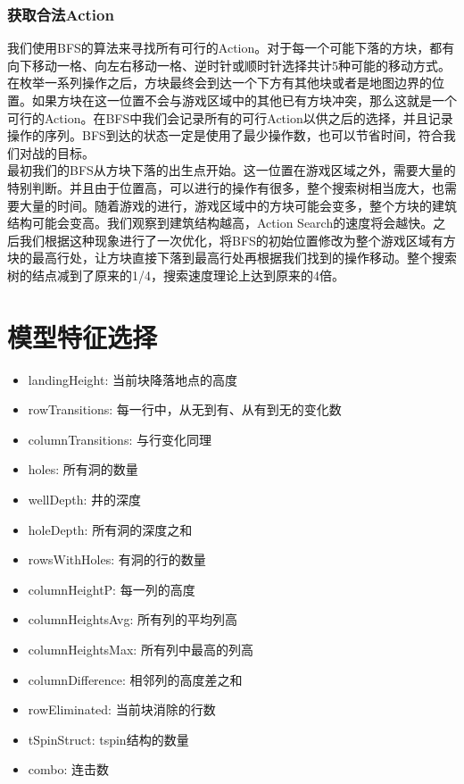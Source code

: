 \documentclass[10pt,UTF8]{article}
\begin{document}
\begin{multicols}{2}
\subsubsection{获取合法Action}

我们使用BFS的算法来寻找所有可行的Action。对于每一个可能下落的方块，都有向下移动一格、向左右移动一格、逆时针或顺时针选择共计5种可能的移动方式。在枚举一系列操作之后，方块最终会到达一个下方有其他块或者是地图边界的位置。如果方块在这一位置不会与游戏区域中的其他已有方块冲突，那么这就是一个可行的Action。在BFS中我们会记录所有的可行Action以供之后的选择，并且记录操作的序列。BFS到达的状态一定是使用了最少操作数，也可以节省时间，符合我们对战的目标。\\

最初我们的BFS从方块下落的出生点开始。这一位置在游戏区域之外，需要大量的特别判断。并且由于位置高，可以进行的操作有很多，整个搜索树相当庞大，也需要大量的时间。随着游戏的进行，游戏区域中的方块可能会变多，整个方块的建筑结构可能会变高。我们观察到建筑结构越高，Action Search的速度将会越快。之后我们根据这种现象进行了一次优化，将BFS的初始位置修改为整个游戏区域有方块的最高行处，让方块直接下落到最高行处再根据我们找到的操作移动。整个搜索树的结点减到了原来的1/4，搜索速度理论上达到原来的4倍。

\section{模型特征选择}

\begin{itemize}
    \itemsep-5pt
    \item landingHeight: 当前块降落地点的高度
    \item rowTransitions: 每一行中，从无到有、从有到无的变化数
    \item columnTransitions: 与行变化同理
    \item holes: 所有洞的数量
    \item wellDepth: 井的深度
    \item holeDepth: 所有洞的深度之和
    \item rowsWithHoles: 有洞的行的数量
    \item columnHeightP: 每一列的高度
    \item columnHeightsAvg: 所有列的平均列高
    \item columnHeightsMax: 所有列中最高的列高
    \item columnDifference: 相邻列的高度差之和
    \item rowEliminated: 当前块消除的行数
    \item tSpinStruct: tspin结构的数量
    \item combo: 连击数
\end{itemize}


\end{multicols}
\end{document}
